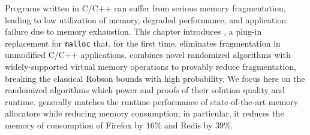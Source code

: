 
Programs written in C/C++ can suffer from serious memory
fragmentation, leading to low utilization of memory, degraded
performance, and application failure due to memory exhaustion. This
chapter introduces \Mesh, a plug-in replacement for \texttt{malloc}
that, for the first time, eliminates fragmentation in unmodified
C/C++ applications. \Mesh combines novel randomized algorithms with
widely-supported virtual memory operations to provably reduce
fragmentation, breaking the classical Robson bounds with high
probability. We focus here on the randomized algorithms which power \Mesh and proofs of their solution quality and runtime.  \Mesh generally matches the runtime performance of
state-of-the-art memory allocators while reducing memory consumption;
in particular, it reduces the memory of consumption of Firefox by 16\%
and Redis by 39\%.


